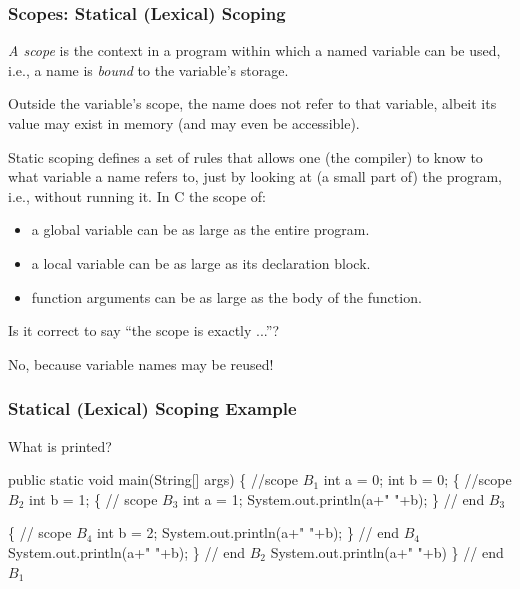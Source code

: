 \documentclass{beamer}
\renewcommand{\emph}[1]{\textcolor{structure}{#1}}
\newcommand{\emp}[1]{\textcolor{DikuRed}{ #1}}
\newcommand{\emphh}[1]{\textcolor{CosGreen}{ #1}}
\newcommand{\emphb}[1]{\textcolor{CosBlue}{ #1}}
\newcommand{\mymath}[1]{$ #1 $}
\newcommand{\myindx}[1]{_{#1}}
\begin{document}
\begin{frame}
\frametitle{Scopes: Statical (Lexical) Scoping}

{\em A scope} is the context in a program within which a named variable
can be used, i.e., a name is {\em bound} to the variable's storage.

\bigskip

Outside the variable's scope, the name does not refer to that variable,
albeit its value may exist in memory (and may even be accessible).

\pause
\bigskip

Static scoping defines a set of rules that allows one (the compiler) to
know to what variable a name refers to, just by looking at (a small
part of) the program, i.e., without running it. In C the scope of:
\begin{itemize}
    \item a global variable \emph{can be as large as} the entire program.\smallskip
    \item a local variable \emph{can be as large as} its declaration block.\smallskip
    \item function arguments \emph{can be as large as} the body of the function.\smallskip
\end{itemize}

Is it correct to say ``the scope \emp{is exactly} ...''?

\pause
\smallskip

No, because variable names may be reused!
\end{frame}



\begin{frame}[fragile,t]
\frametitle{Statical (Lexical) Scoping Example}

\begin{block}{What is printed? }
\begin{colorcode}[fontsize=\scriptsize]
public static void main(String[] args) \{                        \emphh{//scope \mymath{B\myindx{1}}}
    int a = 0;
    int b = 0;
    \{                                                    \emphb{//scope \mymath{B\myindx{2}}}
        int b = 1;
        \{                                        //\emp{scope \mymath{B\myindx{3}}}
            int a = 1; System.out.println(a+" "+b);
        \}                                        //\emp{end \mymath{B\myindx{3}}}

        \{                                        //\emp{scope \mymath{B\myindx{4}}}
            int b = 2; System.out.println(a+" "+b);
        \}                                        //\emp{end \mymath{B\myindx{4}}}
        System.out.println(a+" "+b);
    \}                                                    //\emphb{end \mymath{B\myindx{2}}}
    System.out.println(a+" "+b)
\}                                                               //\emphh{end \mymath{B\myindx{1}}}
\end{colorcode}
\end{block}

\end{frame}
\end{document}
